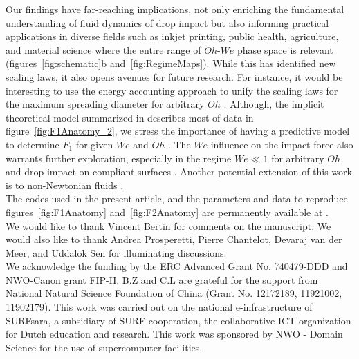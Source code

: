 \documentclass{jfm}
\begin{document}
	Our findings have far-reaching implications, not only enriching the fundamental understanding of fluid dynamics of drop impact but also informing practical applications in diverse fields such as inkjet printing, public health, agriculture, and material science where the entire range of $Oh$-$We$ phase space is relevant (figures~\ref{fig:schematic}b and~\ref{fig:RegimeMaps}). While this has identified new scaling laws, it also opens avenues for future research. For instance, it would be interesting to use the energy accounting approach to unify the scaling laws for the maximum spreading diameter for arbitrary $Oh$ \citep{laan2014maximum, Wildeman2016}. Although, the implicit theoretical model summarized in \citet{cheng2021drop} describes most of data in figure~\ref{fig:F1Anatomy_2}, we stress the importance of having a predictive model to determine $F_1$ for given $We$ and $Oh$ \citep{sanjay2024PRL}. The $We$ influence on the impact force also warrants further exploration, especially in the regime $We \ll 1$ for arbitrary $Oh$ \citep{chevy2012liquid, molavcek2012quasi} and drop impact on compliant surfaces \citep{alventosa_cimpeanu_harris_2023, ma2023scaling}. Another potential extension of this work is to non-Newtonian fluids \citep{martouzet2021dynamic, aguero2022impact, bertin2023similarity, jin2023marbles}.\\[5mm] 
	
	 The codes used in the present article, and the parameters and data to reproduce figures~\ref{fig:F1Anatomy} and~\ref{fig:F2Anatomy} are permanently available at \citet{basiliskVatsal}.\\
	
	  We would like to thank Vincent Bertin for comments on the manuscript. We would also like to thank Andrea Prosperetti, Pierre Chantelot, Devaraj van der Meer, and Uddalok Sen for illuminating discussions.\\
	
	 We acknowledge the funding by the ERC Advanced Grant No. 740479-DDD and NWO-Canon grant FIP-II. B.Z and C.L are grateful for the support from National Natural Science Foundation of China (Grant No. 12172189, 11921002, 11902179). This work was carried out on the national e-infrastructure of SURFsara, a subsidiary of SURF cooperation, the collaborative ICT organization for Dutch education and research. This work was sponsored by NWO - Domain Science for the use of supercomputer facilities.\\
	
\end{document}
